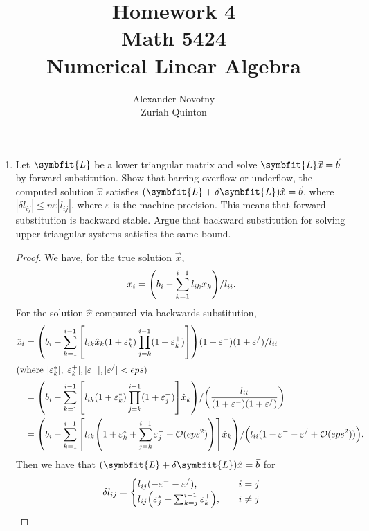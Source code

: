 \documentclass{article}
\title{Homework 4\\{\large Math 5424}\\{\large Numerical Linear Algebra}}
\author{Alexander Novotny\\Zuriah Quinton}
\theoremstyle{definition}
\newcommand{\mat}[1]{\symbfit{#1}}
\begin{document}
\maketitle

\begin{enumerate}[leftmargin=\labelsep]
	\item Let \(\mat{L}\) be a lower triangular matrix and solve \(\mat{L}\vec{x} = \vec{b}\) by forward substitution. Show that barring overflow or underflow, the computed solution \(\hat{x}\) satisfies \((\mat{L} + \delta\mat{L})\hat{x} = \vec{b}\), where \(|\delta l_{ij}| \leq n\varepsilon|l_{ij}|\), where \(\varepsilon\) is the machine precision. This means that forward substitution is backward stable. Argue that backward substitution for solving upper triangular systems satisfies the same bound.
	      \begin{proof}
		      We have, for the true solution \(\vec{x}\),
		      \[
			      x_i = \qty(b_i - \sum_{k = 1}^{i-1} l_{ik}x_k) / l_{ii}.
		      \]
		      For the solution \(\hat{x}\) computed via backwards substitution,
		      \begin{align*}
			      \hat{x}_i & = \qty(b_i - \sum_{k = 1}^{i-1} \qty[l_{ik}\hat{x}_k(1 + \varepsilon^*_k) \prod_{j=k}^{i-1}(1 + \varepsilon^+_k)])(1 + \varepsilon^-)(1 + \varepsilon^/) / l_{ii}                                              \\
			      \shortintertext{(where \(|\varepsilon^*_k|, |\varepsilon^+_k|, |\varepsilon^-|, |\varepsilon^/| < eps\))}
			                & = \qty(b_i - \sum_{k = 1}^{i-1} \qty[l_{ik}(1 + \varepsilon^*_k) \prod_{j=k}^{i-1}(1 + \varepsilon^+_j)]\hat{x}_k) / \qty(\frac{l_{ii}}{(1 + \varepsilon^-)(1 + \varepsilon^/)})                               \\
			                & = \qty(b_i - \sum_{k = 1}^{i-1} \qty[l_{ik}\qty(1 + \varepsilon^*_k + \sum_{j=k}^{i-1}\varepsilon^+_j + \mathcal{O}(eps^2))]\hat{x}_k) / \qty(l_{ii}(1 - \varepsilon^- - \varepsilon^/ + \mathcal{O}(eps^2))).
		      \end{align*}
		      Then we have that \((\mat{L} + \delta\mat{L})\hat{x} = \vec{b}\) for
		      \begin{alignat*}{4}
			               &  & \delta l_{ij}   & = \begin{cases}
				                                        l_{ij} (- \varepsilon^- - \varepsilon^/),                       & \quad i = j    \\
				                                        l_{ij} \qty(\varepsilon^*_j + \sum_{k=j}^{i-1}\varepsilon^+_k), & \quad i \neq j

\end{cases}
\end{alignat*}
\end{proof}
\end{enumerate}
\end{document}
